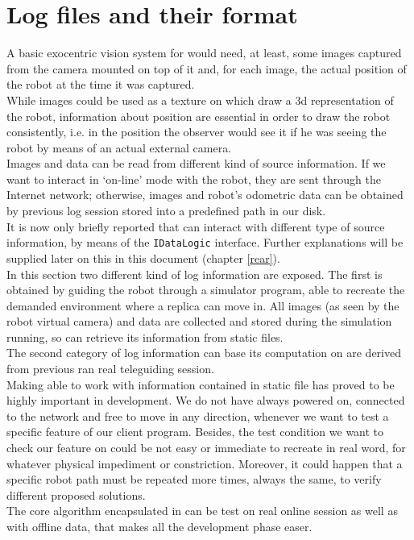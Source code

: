 \setcounter{figure}{0}
\setcounter{table}{0}
\setcounter{lstlisting}{0}

\chapter{Log files and their format}
\label{log}
\minitoc

A basic exocentric vision system for \morduc{} would need, 
at least, some images captured from the camera mounted 
on top of it and, for each image, the actual position of 
the robot at the time it was captured.
\\
While images could be used as a texture on which draw 
a 3d representation of the robot, information about 
position are essential in order to draw the robot 
consistently, i.e. in the position the observer would 
see it if he was seeing the robot by means of an actual 
external camera.
\\
Images and data can be read from different kind of source 
information. If we want to interact in `on-line' mode with
the robot, they are sent through the Internet network;
otherwise, images and robot's odometric data can be
obtained by previous log session stored into a predefined
path in our disk.
\\
It is now only briefly reported that
\framework{} can interact with different type of source
information, by means of the \texttt{IDataLogic} interface.
Further explanations will be supplied later on this in this
document (chapter \ref{rear}).
\\
In this section two different kind of log information are
exposed. The first is obtained by guiding the robot through
a simulator program, able to recreate the demanded environment
where a \morduc{} replica can move in. All images (as seen by
the robot virtual camera) and data are collected and stored
during the simulation running, so \framework{} can retrieve
its information from static files.
\\
The second category of log information \framework{} can base
its computation on are derived from previous ran 
real \morduc{} teleguiding
session.
\\
Making \framework{} able to work with information contained in
static file has proved to be highly important in development.
We do not have \morduc{} always powered on, connected to the
network and free to move in any direction, whenever
we want to test a specific feature of our client program. Besides,
the test condition we want to check our feature on could be not easy
or immediate to recreate in real word, for whatever physical
impediment or constriction. Moreover, it could happen that a specific
robot
path must be repeated more times, always the same, to verify
different proposed solutions.
\\
The core algorithm encapsulated in \framework{} can be test
on real online session as well as with offline data, that 
makes all the development phase easer.

\clearpage


\clearpage

